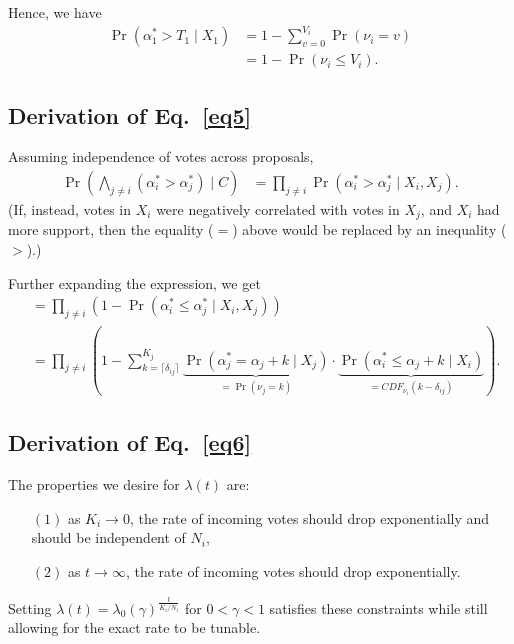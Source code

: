 \documentclass[format=acmsmall, review=true, screen=true, anonymous=true]{acmart}
\begin{document}
Hence, we have
\begin{align*}
\Pr(\alpha^*_1 > T_1 \mid X_1) &= 1 - \sum\limits_{v=0}^{V_i} \Pr(\nu_i = v)\\
&= 1 - \Pr(\nu_i \leq V_i).
\end{align*}

\subsection{Derivation of Eq.~\eqref{eq5}}
Assuming independence of votes across proposals,
\begin{align*}
\Pr\left(\bigwedge_{j \neq i} (\alpha^*_i > \alpha^*_j) \mid C\right) &=\prod_{j \neq i} \Pr(\alpha^*_i > \alpha^*_j \mid X_i, X_j).
\end{align*}
(If, instead, votes in $X_i$ were negatively correlated with votes in $X_j$, and $X_i$ had more support, then the equality ($=$) above would be replaced by an inequality ($>$).)

Further expanding the expression, we get
\begin{align*}
&= \prod_{j \neq i} \left( 1 - \Pr(\alpha^*_i \leq \alpha^*_j \mid X_i, X_j) \right)\\
&= \prod_{j \neq i} \left( 1 - \sum_{k=\lceil\delta_{ij}\rceil}^{K_j} \underbrace{\Pr(\alpha^*_j = \alpha_j + k \mid X_j)}_{= \Pr(\nu_j = k)} \cdot \underbrace{\Pr(\alpha^*_i \leq \alpha_j + k \mid X_i)}_{={CDF}_{\nu_i}(k - \delta_{ij})} \right).
\end{align*}

\subsection{Derivation of Eq.~\eqref{eq6}}
The properties we desire for $\lambda(t)$ are:
\begin{itemize}
\item[$(1)$] as $K_i \rightarrow 0$, the rate of incoming votes should drop exponentially and should be independent of $N_i$,
\item[$(2)$] as $t \rightarrow \infty$, the rate of incoming votes should drop exponentially.
\end{itemize}
Setting $\lambda (t) = \lambda_0 {(\gamma)}^{\frac{t}{K_i/N_i}}$ for $0 < \gamma < 1$ satisfies these constraints while still allowing for the exact rate to be tunable.
\end{document}
